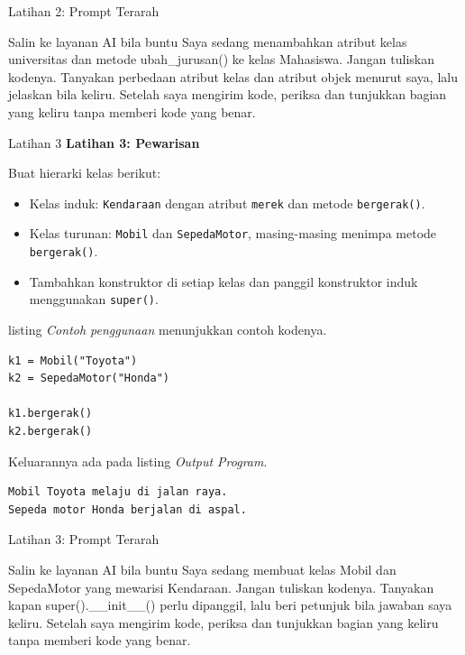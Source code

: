 \documentclass[aspectratio=169, table]{beamer}
\begin{document}
\begin{frame}{Latihan 2: Prompt Terarah}
\begin{block}{Salin ke layanan AI bila buntu}
\small Saya sedang menambahkan atribut kelas universitas dan metode ubah\_jurusan() ke kelas Mahasiswa. Jangan tuliskan kodenya. Tanyakan perbedaan atribut kelas dan atribut objek menurut saya, lalu jelaskan bila keliru. Setelah saya mengirim kode, periksa dan tunjukkan bagian yang keliru tanpa memberi kode yang benar.
\end{block}
\end{frame}

\begin{frame}[fragile,allowframebreaks=0.8]{Latihan 3}
\footnotesize
\textbf{Latihan 3: Pewarisan}\par\medskip
Buat hierarki kelas berikut:
\begin{itemize}
    \item Kelas induk: \texttt{Kendaraan} dengan atribut \texttt{merek} dan metode \texttt{bergerak()}.
    \item Kelas turunan: \texttt{Mobil} dan \texttt{SepedaMotor}, masing-masing menimpa metode \texttt{bergerak()}.
    \item Tambahkan konstruktor di setiap kelas dan panggil konstruktor induk menggunakan \texttt{super()}.
\end{itemize}

listing \textit{Contoh penggunaan} menunjukkan contoh kodenya.

\begin{lstlisting}[style=PythonStyle, breaklines=true]
k1 = Mobil("Toyota")
k2 = SepedaMotor("Honda")

k1.bergerak()
k2.bergerak()
\end{lstlisting}

Keluarannya ada pada listing \textit{Output Program}.

\begin{lstlisting}[language=bash, breaklines=true, basicstyle=\ttfamily\scriptsize]
Mobil Toyota melaju di jalan raya.
Sepeda motor Honda berjalan di aspal.
\end{lstlisting}
\end{frame}

\begin{frame}{Latihan 3: Prompt Terarah}
\begin{block}{Salin ke layanan AI bila buntu}
\small Saya sedang membuat kelas Mobil dan SepedaMotor yang mewarisi Kendaraan. Jangan tuliskan kodenya. Tanyakan kapan super().\_\_init\_\_() perlu dipanggil, lalu beri petunjuk bila jawaban saya keliru. Setelah saya mengirim kode, periksa dan tunjukkan bagian yang keliru tanpa memberi kode yang benar.
\end{block}
\end{frame}
\end{document}
